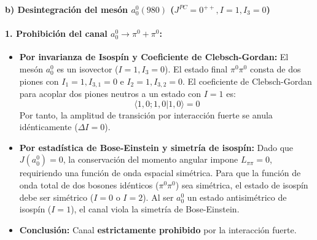 \begin{problema}
\vspace{0.3cm}
\textbf{b) Desintegración del mesón $a_0^0(980)$ ($J^{PC} = 0^{++}, I=1, I_3=0$)}

\paragraph{1. Prohibición del canal $a_0^0 \to \pi^0 + \pi^0$:}
\begin{itemize}
    \item \textbf{Por invarianza de Isospín y Coeficiente de Clebsch-Gordan:} El mesón $a_0^0$ es un isovector ($I=1, I_3=0$). El estado final $\pi^0\pi^0$ consta de dos piones con $I_1=1, I_{3,1}=0$ e $I_2=1, I_{3,2}=0$. El coeficiente de Clebsch-Gordan para acoplar dos piones neutros a un estado con $I=1$ es:
    \begin{equation*}
        \langle 1, 0; 1, 0 | 1, 0 \rangle = 0
    \end{equation*}
    Por tanto, la amplitud de transición por interacción fuerte se anula idénticamente ($\Delta I = 0$).
    \item \textbf{Por estadística de Bose-Einstein y simetría de isospín:} Dado que $J(a_0^0) = 0$, la conservación del momento angular impone $L_{\pi\pi} = 0$, requiriendo una función de onda espacial simétrica. Para que la función de onda total de dos bosones idénticos ($\pi^0\pi^0$) sea simétrica, el estado de isospín debe ser simétrico ($I=0$ o $I=2$). Al ser $a_0^0$ un estado antisimétrico de isospín ($I=1$), el canal viola la simetría de Bose-Einstein.
    \item \textbf{Conclusión:} Canal \textbf{estrictamente prohibido} por la interacción fuerte.
\end{itemize}


\end{problema}
